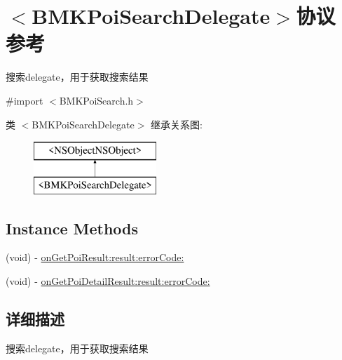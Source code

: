 \hypertarget{protocol_b_m_k_poi_search_delegate-p}{\section{$<$B\+M\+K\+Poi\+Search\+Delegate$>$协议 参考}
\label{protocol_b_m_k_poi_search_delegate-p}
}


搜索delegate，用于获取搜索结果  




{\ttfamily \#import $<$B\+M\+K\+Poi\+Search.\+h$>$}

类 $<$B\+M\+K\+Poi\+Search\+Delegate$>$ 继承关系图\+:\begin{figure}[H]
\begin{center}
\leavevmode
\includegraphics[height=2.000000cm]{protocol_b_m_k_poi_search_delegate-p}
\end{center}
\end{figure}
\subsection*{Instance Methods}
\begin{DoxyCompactItemize}
\item 
(void) -\/ \hyperlink{protocol_b_m_k_poi_search_delegate-p_ac37fca8bc7dc97af6e2eccdf5c17bcf7}{on\+Get\+Poi\+Result\+:result\+:error\+Code\+:}
\item 
(void) -\/ \hyperlink{protocol_b_m_k_poi_search_delegate-p_a510274f805b822e918ed2d1374577b8b}{on\+Get\+Poi\+Detail\+Result\+:result\+:error\+Code\+:}
\end{DoxyCompactItemize}


\subsection{详细描述}
搜索delegate，用于获取搜索结果 

